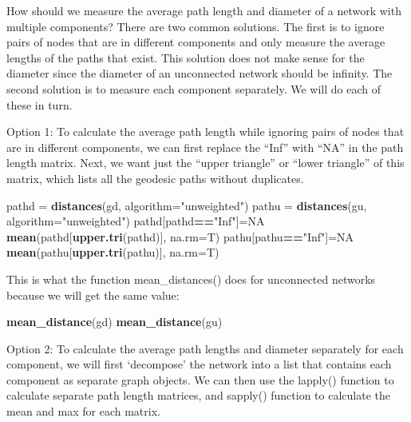 \documentclass[
]{article}
\newenvironment{Shaded}{\begin{snugshade}}{\end{snugshade}}
\newcommand{\AttributeTok}[1]{\textcolor[rgb]{0.13,0.29,0.53}{#1}}
\newcommand{\ConstantTok}[1]{\textcolor[rgb]{0.56,0.35,0.01}{#1}}
\newcommand{\FunctionTok}[1]{\textcolor[rgb]{0.13,0.29,0.53}{\textbf{#1}}}
\newcommand{\NormalTok}[1]{#1}
\newcommand{\OtherTok}[1]{\textcolor[rgb]{0.56,0.35,0.01}{#1}}
\newcommand{\SpecialCharTok}[1]{\textcolor[rgb]{0.81,0.36,0.00}{\textbf{#1}}}
\newcommand{\StringTok}[1]{\textcolor[rgb]{0.31,0.60,0.02}{#1}}
\begin{document}
How should we measure the average path length and diameter of a network with multiple components? There are two common solutions. The first is to ignore pairs of nodes that are in different components and only measure the average lengths of the paths that exist. This solution does not make sense for the diameter since the diameter of an unconnected network should be infinity. The second solution is to measure each component separately. We will do each of these in turn.

Option 1: To calculate the average path length while ignoring pairs of nodes that are in different components, we can first replace the ``Inf'' with ``NA'' in the path length matrix. Next, we want just the ``upper triangle'' or ``lower triangle'' of this matrix, which lists all the geodesic paths without duplicates.

\footnotesize

\begin{Shaded}
\begin{Highlighting}[]
\NormalTok{pathd }\OtherTok{=} \FunctionTok{distances}\NormalTok{(gd, }\AttributeTok{algorithm=}\StringTok{"unweighted"}\NormalTok{)}
\NormalTok{pathu }\OtherTok{=} \FunctionTok{distances}\NormalTok{(gu, }\AttributeTok{algorithm=}\StringTok{"unweighted"}\NormalTok{)}
\NormalTok{pathd[pathd}\SpecialCharTok{==}\StringTok{"Inf"}\NormalTok{]}\OtherTok{=}\ConstantTok{NA}
\FunctionTok{mean}\NormalTok{(pathd[}\FunctionTok{upper.tri}\NormalTok{(pathd)], }\AttributeTok{na.rm=}\NormalTok{T)}
\NormalTok{pathu[pathu}\SpecialCharTok{==}\StringTok{"Inf"}\NormalTok{]}\OtherTok{=}\ConstantTok{NA}
\FunctionTok{mean}\NormalTok{(pathu[}\FunctionTok{upper.tri}\NormalTok{(pathu)], }\AttributeTok{na.rm=}\NormalTok{T)}
\end{Highlighting}
\end{Shaded}

\normalsize

This is what the function mean\_distances() does for unconnected networks because we will get the same value:

\footnotesize

\begin{Shaded}
\begin{Highlighting}[]
\FunctionTok{mean\_distance}\NormalTok{(gd)}
\FunctionTok{mean\_distance}\NormalTok{(gu)}
\end{Highlighting}
\end{Shaded}

\normalsize

Option 2: To calculate the average path lengths and diameter separately for each component, we will first `decompose' the network into a list that contains each component as separate graph objects. We can then use the lapply() function to calculate separate path length matrices, and sapply() function to calculate the mean and max for each matrix.
\end{document}
